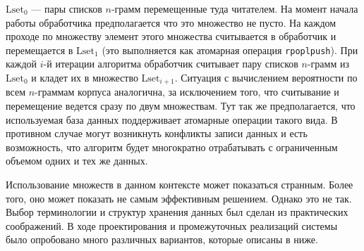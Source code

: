 $\mathrm{Lset}_0$ --- пары списков $n$-грамм перемещенные туда читателем.
На момент начала работы обработчика предполагается что это множество не пусто.
На каждом проходе по множеству элемент этого множества считывается в обработчик
и перемещается в $\mathrm{Lset}_1$ (это выполняется как атомарная операция {\tt rpoplpush}).
При каждой $i$-й итерации алгоритма обработчик считывает 
пару списков $n$-грамм из $\mathrm{Lset}_0$ и кладет их в множество $\mathrm{Lset}_{i+1}$.
Ситуация с вычислением вероятности по всем $n$-граммам корпуса аналогична,
за исключением того, что считывание и перемещение ведется сразу по двум множествам.
Тут так же предполагается, что используемая база данных поддерживает 
атомарные операции такого вида.
В противном случае могут возникнуть конфликты записи данных
и есть возможность, что алгоритм будет многократно отрабатывать 
с ограниченным объемом одних и тех же данных.

Использование множеств в данном контексте может показаться странным.
Более того, оно может показать не самым эффективным решением.
Однако это не так. 
Выбор терминологии и структур хранения данных 
был сделан из практических соображений.
В ходе проектирования и промежуточных реализаций системы 
было опробовано много различных вариантов, которые описаны в ниже.

\pagebreak

